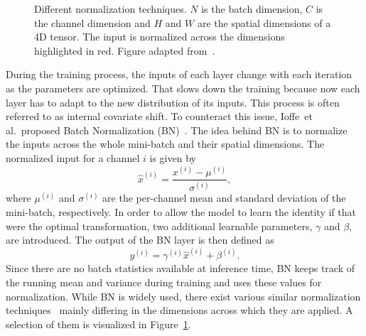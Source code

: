 \begin{figure}
    \hfill

    \caption{
        Different normalization techniques. $N$ is the batch dimension, $C$ is the channel dimension and $H$ and $W$ are
        the spatial dimensions of a 4D tensor. The input is normalized across the dimensions highlighted in red.
        Figure adapted from~\cite{GroupNorm}.
    }\label{fig:normalization}
\end{figure}

During the training process, the inputs of each layer change with each iteration as the parameters are optimized.
That slows down the training because now each layer has to adapt to the new distribution of its inputs. This process is often referred to as internal covariate shift.
To counteract this issue, Ioffe~et al.\ proposed Batch Normalization (BN)~\cite{BatchNorm}.
The idea behind BN is to normalize the inputs across the whole mini-batch and their spatial dimensions.
The normalized input for a channel $i$ is given by
\begin{equation}
    \hat{x}^{(i)} = \frac{x^{(i)} - \mu^{(i)}}{\sigma^{(i)}},
\end{equation} 
where $\mu^{(i)}$ and $\sigma^{(i)}$ are the per-channel mean and standard deviation of the mini-batch, respectively.  
In order to allow the model to learn the identity if that were the optimal transformation, two additional learnable parameters, $\gamma$ and $\beta$, are introduced. The output of the BN layer is then defined as
\begin{equation}
    y^{(i)} = \gamma^{(i)}\hat{x}^{(i)} + \beta^{(i)}.
\end{equation}
Since there are no batch statistics available at inference time, BN keeps track of the running mean and variance during training and uses these values for normalization.
While BN is widely used, there exist various similar normalization techniques~\cite{LayerNorm, InstanceNorm, GroupNorm} mainly differing in the dimensions across which they are applied.
A selection of them is visualized in Figure~\ref{fig:normalization}.


